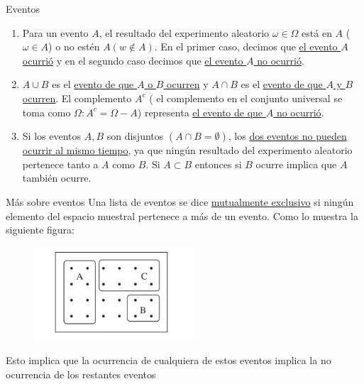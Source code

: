 \documentclass{beamer}
\begin{document}
\begin{frame}{Eventos  }
\begin{enumerate}
\item Para un evento $A$, el resultado del experimento aleatorio $ \omega \in \Omega $ est\'a en $A$ ($\omega \in A$) o   no est\' en  $A (w \notin A)$. En el primer caso, decimos que \underline{ el evento $A$ ocurri\'o}  y en el segundo caso decimos que \underline{el evento $A$ no ocurri\'o}.

\item $A \cup B$ es el \underline{evento de que $A$ o $B$ ocurren} y $A \cap B$ es el \underline{evento de que $A$ y $B$ ocurren}. El complemento $A^c$ ( el complemento en el conjunto universal se toma como $\Omega: A^c = \Omega -A$) representa \underline{el evento de que $A$ no ocurri\'o}. 

\item Si los eventos $A, B$ son disjuntos $(A \cap B = \emptyset)$, los \underline{dos eventos no pueden ocurrir al mismo tiempo}, ya que ning\'un resultado del experimento aleatorio pertenece tanto a $A$ como $B$. Si $A \subset B$ entonces si  $B$ ocurre implica que $A$ tambi\'en ocurre.
\end{enumerate}
\end{frame}

\begin{frame}{M\'as sobre eventos}
 Una lista de eventos se dice \underline{mutualmente exclusivo} si ning\'un elemento del espacio muestral pertenece a m\'as de un evento. Como lo muestra la siguiente figura:
 
 \vspace{0.2cm}
 
 \begin{figure}[!htb]
 	\centering
 	\includegraphics[width=6cm]{p3}
 \end{figure}
\scriptsize{Esto implica que  la ocurrencia de cualquiera de estos eventos  implica la no ocurrencia de los restantes  eventos}
\end{frame}
\end{document}
